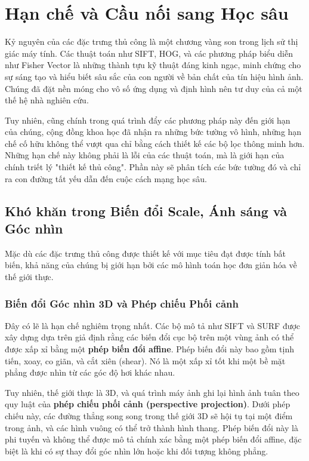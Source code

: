\section{Hạn chế và Cầu nối sang Học sâu}
\label{sec:limitations_and_bridge_to_deep_learning}

Kỷ nguyên của các đặc trưng thủ công là một chương vàng son trong lịch sử thị giác máy tính. Các thuật toán như SIFT, HOG, và các phương pháp biểu diễn như Fisher Vector là những thành tựu kỹ thuật đáng kinh ngạc, minh chứng cho sự sáng tạo và hiểu biết sâu sắc của con người về bản chất của tín hiệu hình ảnh. Chúng đã đặt nền móng cho vô số ứng dụng và định hình nên tư duy của cả một thế hệ nhà nghiên cứu.

Tuy nhiên, cũng chính trong quá trình đẩy các phương pháp này đến giới hạn của chúng, cộng đồng khoa học đã nhận ra những bức tường vô hình, những hạn chế cố hữu không thể vượt qua chỉ bằng cách thiết kế các bộ lọc thông minh hơn. Những hạn chế này không phải là lỗi của các thuật toán, mà là giới hạn của chính triết lý "thiết kế thủ công". Phần này sẽ phân tích các bức tường đó và chỉ ra con đường tất yếu dẫn đến cuộc cách mạng học sâu.

\subsection{Khó khăn trong Biến đổi Scale, Ánh sáng và Góc nhìn}
\label{subsec:transformation_challenges}

Mặc dù các đặc trưng thủ công được thiết kế với mục tiêu đạt được tính bất biến, khả năng của chúng bị giới hạn bởi các mô hình toán học đơn giản hóa về thế giới thực.

\subsubsection{Biến đổi Góc nhìn 3D và Phép chiếu Phối cảnh}
\label{subsubsec:viewpoint_limitations}
Đây có lẽ là hạn chế nghiêm trọng nhất. Các bộ mô tả như SIFT và SURF được xây dựng dựa trên giả định rằng các biến đổi cục bộ trên một vùng ảnh có thể được xấp xỉ bằng một \textbf{phép biến đổi affine}. Phép biến đổi này bao gồm tịnh tiến, xoay, co giãn, và cắt xiên (shear). Nó là một xấp xỉ tốt khi một bề mặt phẳng được nhìn từ các góc độ hơi khác nhau.

Tuy nhiên, thế giới thực là 3D, và quá trình máy ảnh ghi lại hình ảnh tuân theo quy luật của \textbf{phép chiếu phối cảnh (perspective projection)}. Dưới phép chiếu này, các đường thẳng song song trong thế giới 3D sẽ hội tụ tại một điểm trong ảnh, và các hình vuông có thể trở thành hình thang. Phép biến đổi này là phi tuyến và không thể được mô tả chính xác bằng một phép biến đổi affine, đặc biệt là khi có sự thay đổi góc nhìn lớn hoặc khi đối tượng không phẳng.

